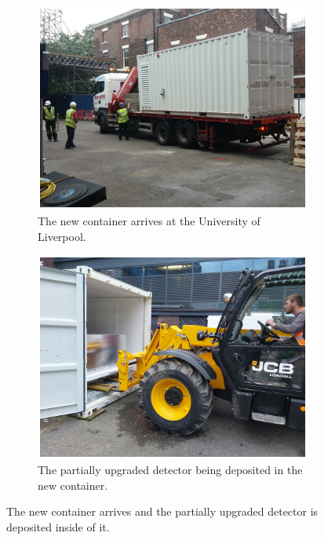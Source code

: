 \begin{figure}[htbp]
\centering
\begin{subfigure}{.5\textwidth}
  \centering
  \includegraphics[width=\linewidth]{Chapter3/Figs/Raster/detCon037c_ContainerArrives.png}
  \captionsetup{width=.9\linewidth}
  \caption{The new container arrives at the University of Liverpool.}
  \label{subFig:detCon037c_ContainerArrives}
\end{subfigure}%
\begin{subfigure}{.5\textwidth}
  \centering
  \includegraphics[width=\linewidth]{Chapter3/Figs/Raster/detCon039b_PutIn2.png}
  \captionsetup{width=.9\linewidth}
  \caption{The partially upgraded detector being deposited in the new container.}
  \label{subFig:detCon039b_PutIn2}
\end{subfigure}
\caption{The new container arrives and the partially upgraded detector is deposited inside of it.}
\label{fig:detCon_ContainerArrives_PutIn}
\end{figure}

